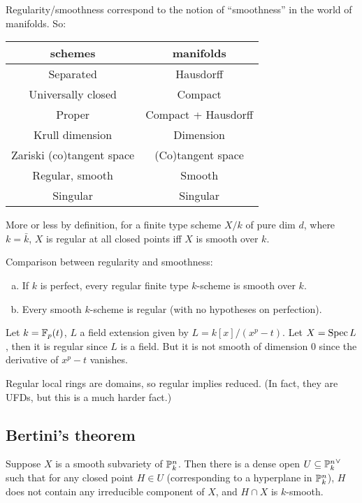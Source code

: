 \documentclass[11pt]{amsart}
\begin{document}
Regularity/smoothness correspond to the notion of ``smoothness'' in the world of manifolds. So:

\begin{center}
\begin{tabular}{c|c}
schemes & manifolds \\
\hline
Separated & Hausdorff \\
Universally closed & Compact \\
Proper & Compact + Hausdorff \\
Krull dimension & Dimension \\
Zariski (co)tangent space & (Co)tangent space \\
Regular, smooth & Smooth \\
Singular & Singular
\end{tabular}
\end{center}

More or less by definition, for a finite type scheme $X/k$ of pure dim $d$, where $k = \bar{k}$, $X$ is regular at all closed points iff $X$ is smooth over $k$. 


\begin{thm}
Comparison between regularity and smoothness:
\begin{enumerate}[(a)]
    \item If $k$ is perfect, every regular finite type $k$-scheme is smooth over $k$.
    \item Every smooth $k$-scheme is regular (with no hypotheses on perfection).
\end{enumerate}
\end{thm}

\begin{exm}
    Let $k = \mathbb{F}_p(t)$, $L$ a field extension given by $L = k[x]/(x^p-t)$. Let $X = \operatorname{Spec} L$, then it is regular since $L$ is a field. But it is not smooth of dimension 0 since the derivative of $x^p-t$ vanishes.
\end{exm}

\begin{thm}
    Regular local rings are domains, so regular implies reduced. (In fact, they are UFDs, but this is a much harder fact.)
\end{thm}


\subsection{Bertini's theorem}


\begin{thm}[Bertini]
    Suppose $X$ is a smooth subvariety of $\mathbb{P}^n_k$. Then there is a dense open $U\subseteq {\mathbb{P}^n_k}^{\vee}$ such that for any closed point $H\in U$ (corresponding to a hyperplane in $\mathbb{P}^n_k$), $H$ does not contain any irreducible component of $X$, and $H\cap X$ is $k$-smooth.
\end{thm}
\end{document}
